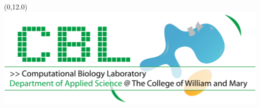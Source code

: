 \documentclass[a0]{a0poster}
\begin{document}
\begin{textblock}{7.4}(0,12.0)
\includegraphics[width=6.0in]{Figures/CBLLogo}
\end{textblock}


\end{document}

